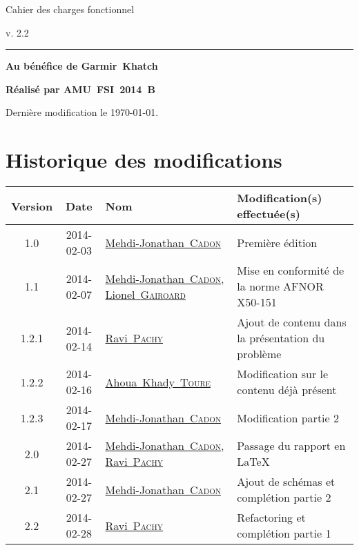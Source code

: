 \documentclass[11pt,fleqn]{book} %
\makeatletter
\newcommand{\mo}{Garmir~Khatch\xspace}
\newcommand{\amo}{AMU~FSI~2014~B\xspace}
\newcommand{\ravi}{\href{mailto:pachy.ravi@gmail.com}{Ravi~\textsc{Pachy}}\xspace}
\newcommand{\mj}{\href{mailto:mehdi-jonathan@hotmail.fr}{Mehdi-Jonathan~\textsc{Cadon}}\xspace}
\newcommand{\lionel}{\href{mailto:lionel.gairoard@gmail.com}{Lionel~\textsc{Gairoard}}\xspace}
\newcommand{\khady}{\href{mailto:takamor91@yahoo.fr}{Ahoua~Khady~\textsc{Toure}}\xspace}
\newcommand{\version}{2.2}
\makeatother
\begin{document}

\begingroup
\thispagestyle{empty}
\centering
\vspace*{6cm}
\par\normalfont\fontsize{35}{35}\sffamily\selectfont
Cahier des charges fonctionnel\par %
\vspace*{1cm}
{\Huge v. \version}\par %
\vspace*{1cm}
\rule{\linewidth}{.5pt}
\begin{center}
{\small \bfseries Au bénéfice de \mo}\par
{\small \bfseries Réalisé par \amo}\par
{\footnotesize Dernière modification le \today.}
\end{center}
\endgroup
\newpage

\section*{Historique des modifications}
\noindent
\begin{tabularx}{\linewidth}{|c|c|p{3.8cm}|X|}
\hline
\textbf{Version} & \textbf{Date} & \textbf{Nom} & \textbf{Modification(s) effectuée(s)}\\
\hline\hline
1.0 & 2014-02-03 & \mj & Première édition \\\hline
1.1 & 2014-02-07 & \mj, \lionel & Mise en conformité de la norme AFNOR X50-151 \\\hline
1.2.1 & 2014-02-14 & \ravi & Ajout de contenu dans la présentation du problème \\\hline
1.2.2 & 2014-02-16 & \khady & Modification sur le contenu déjà présent \\\hline
1.2.3 & 2014-02-17 & \mj & Modification partie 2 \\\hline
2.0 & 2014-02-27 & \mj, \ravi & Passage du rapport en \LaTeX \\\hline
2.1 & 2014-02-27 & \mj & Ajout de schémas et complétion partie 2 \\\hline
2.2 & 2014-02-28 & \ravi & Refactoring et complétion partie 1 \\\hline
\end{tabularx}
\end{document}
